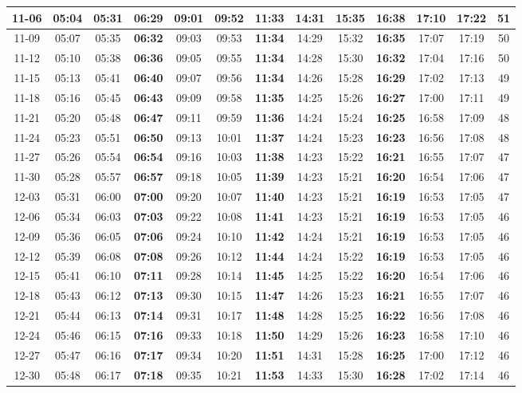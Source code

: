 \begin{footnotesize}
\begin{longtable}{c | c | c | c | c | c | c | c | c | c | c | c | c}
		11-06&05:04&05:31&\textbf{06:29}&09:01&09:52&\textbf{11:33}&14:31&15:35&\textbf{16:38}&17:10&17:22&51\\\hline
		11-09&05:07&05:35&\textbf{06:32}&09:03&09:53&\textbf{11:34}&14:29&15:32&\textbf{16:35}&17:07&17:19&50\\\hline
		11-12&05:10&05:38&\textbf{06:36}&09:05&09:55&\textbf{11:34}&14:28&15:30&\textbf{16:32}&17:04&17:16&50\\\hline
		11-15&05:13&05:41&\textbf{06:40}&09:07&09:56&\textbf{11:34}&14:26&15:28&\textbf{16:29}&17:02&17:13&49\\\hline
		11-18&05:16&05:45&\textbf{06:43}&09:09&09:58&\textbf{11:35}&14:25&15:26&\textbf{16:27}&17:00&17:11&49\\\hline
		11-21&05:20&05:48&\textbf{06:47}&09:11&09:59&\textbf{11:36}&14:24&15:24&\textbf{16:25}&16:58&17:09&48\\\hline
		11-24&05:23&05:51&\textbf{06:50}&09:13&10:01&\textbf{11:37}&14:24&15:23&\textbf{16:23}&16:56&17:08&48\\\hline
		11-27&05:26&05:54&\textbf{06:54}&09:16&10:03&\textbf{11:38}&14:23&15:22&\textbf{16:21}&16:55&17:07&47\\\hline
		11-30&05:28&05:57&\textbf{06:57}&09:18&10:05&\textbf{11:39}&14:23&15:21&\textbf{16:20}&16:54&17:06&47\\\hline
		12-03&05:31&06:00&\textbf{07:00}&09:20&10:07&\textbf{11:40}&14:23&15:21&\textbf{16:19}&16:53&17:05&47\\\hline
		12-06&05:34&06:03&\textbf{07:03}&09:22&10:08&\textbf{11:41}&14:23&15:21&\textbf{16:19}&16:53&17:05&46\\\hline
		12-09&05:36&06:05&\textbf{07:06}&09:24&10:10&\textbf{11:42}&14:24&15:21&\textbf{16:19}&16:53&17:05&46\\\hline
		12-12&05:39&06:08&\textbf{07:08}&09:26&10:12&\textbf{11:44}&14:24&15:22&\textbf{16:19}&16:53&17:05&46\\\hline
		12-15&05:41&06:10&\textbf{07:11}&09:28&10:14&\textbf{11:45}&14:25&15:22&\textbf{16:20}&16:54&17:06&46\\\hline
		12-18&05:43&06:12&\textbf{07:13}&09:30&10:15&\textbf{11:47}&14:26&15:23&\textbf{16:21}&16:55&17:07&46\\\hline
		12-21&05:44&06:13&\textbf{07:14}&09:31&10:17&\textbf{11:48}&14:28&15:25&\textbf{16:22}&16:56&17:08&46\\\hline
		12-24&05:46&06:15&\textbf{07:16}&09:33&10:18&\textbf{11:50}&14:29&15:26&\textbf{16:23}&16:58&17:10&46\\\hline
		12-27&05:47&06:16&\textbf{07:17}&09:34&10:20&\textbf{11:51}&14:31&15:28&\textbf{16:25}&17:00&17:12&46\\\hline
		12-30&05:48&06:17&\textbf{07:18}&09:35&10:21&\textbf{11:53}&14:33&15:30&\textbf{16:28}&17:02&17:14&46\\\hline
\end{longtable}\end{footnotesize}